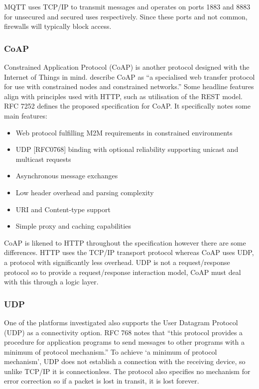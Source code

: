         MQTT uses TCP/IP to transmit messages and operates on ports 1883 and 8883 for unsecured and secured uses respectively. Since these ports and not common, firewalls will typically block access.

      \subsubsection{CoAP}
        Constrained Application Protocol (CoAP) is another protocol designed with the Internet of Things in mind. \citet{rfc7252} describe CoAP as ``a specialised web transfer protocol for use with constrained nodes and constrained networks.'' Some headline features align with principles used with HTTP, such as utilisation of the REST model. RFC 7252 defines the proposed specification for CoAP. It specifically notes some main features:

        \begin{itemize}
          \item Web protocol fulfilling M2M requirements in constrained environments
          \item UDP [RFC0768] binding with optional reliability supporting unicast and multicast requests
          \item Asynchronous message exchanges
          \item Low header overhead and parsing complexity
          \item URI and Content-type support
          \item Simple proxy and caching capabilities
        \end{itemize}

        CoAP is likened to HTTP throughout the specification however there are some differences. HTTP uses the TCP/IP transport protocol whereas CoAP uses UDP, a protocol with significantly less overhead. UDP is not a request/response protocol so to provide a request/response interaction model, CoAP must deal with this through a logic layer.

      \subsubsection{UDP}
        One of the platforms investigated also supports the User Datagram Protocol (UDP) as a connectivity option. RFC 768 \citep{rfc768} notes that ``this protocol provides a procedure for application programs to send messages to other programs with a minimum of protocol mechanism.'' To achieve `a minimum of protocol mechanism', UDP does not establish a connection with the receiving device, so unlike TCP/IP it is connectionless. The protocol also specifies no mechanism for error correction so if a packet is lost in transit, it is lost forever.

